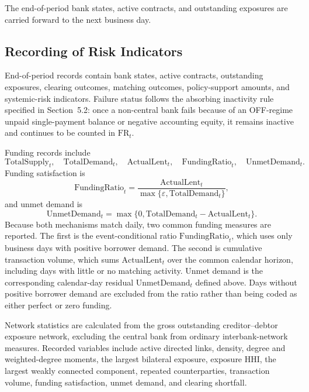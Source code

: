 The end-of-period bank states, active contracts, and outstanding
exposures are carried forward to the next business day.

\subsection{Recording of Risk Indicators}

End-of-period records contain bank states, active contracts, outstanding
exposures, clearing outcomes, matching outcomes, policy-support amounts,
and systemic-risk indicators. Failure status follows the absorbing
inactivity rule specified in Section~5.2: once a non-central bank fails
because of an OFF-regime unpaid single-payment balance or negative
accounting equity, it
remains inactive and continues to be counted in \(\mathrm{FR}_t\).

Funding records include
\begin{equation}
\mathrm{TotalSupply}_t,\quad
\mathrm{TotalDemand}_t,\quad
\mathrm{ActualLent}_t,\quad
\mathrm{FundingRatio}_t,\quad
\mathrm{UnmetDemand}_t.
\end{equation}
Funding satisfaction is
\begin{equation}
\mathrm{FundingRatio}_t
=
\frac{\mathrm{ActualLent}_t}
{\max\{\varepsilon,\mathrm{TotalDemand}_t\}},
\end{equation}
and unmet demand is
\begin{equation}
\mathrm{UnmetDemand}_t
=
\max\{0,\mathrm{TotalDemand}_t-\mathrm{ActualLent}_t\}.
\end{equation}
Because both mechanisms match daily, two common funding measures are
reported. The first is the event-conditional ratio
\(\mathrm{FundingRatio}_t\), which uses only business days with positive
borrower demand. The second is cumulative transaction volume, which sums
\(\mathrm{ActualLent}_t\) over the common calendar horizon, including days
with little or no matching activity. Unmet demand is the corresponding
calendar-day residual \(\mathrm{UnmetDemand}_t\) defined above.
Days without positive borrower demand are excluded from the ratio rather
than being coded as either perfect or zero funding.

Network statistics are calculated from the gross outstanding
creditor--debtor exposure network, excluding the central bank from
ordinary interbank-network measures. Recorded variables include active
directed links, density, degree and weighted-degree moments, the largest
bilateral exposure, exposure HHI, the largest weakly connected component,
repeated counterparties, transaction volume, funding satisfaction,
unmet demand, and clearing shortfall.

